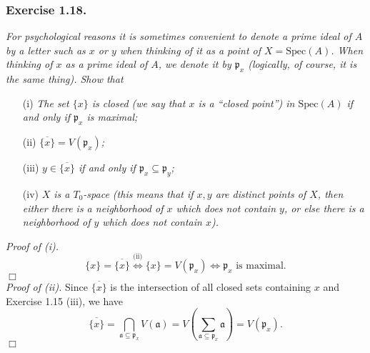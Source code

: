 \documentclass{article}
\begin{document}



\subsubsection*{Exercise 1.18.}
\emph{For psychological reasons it is sometimes convenient to denote a prime ideal of $A$ by
a letter such as $x$ or $y$ when thinking of it as a point of $X = \mathrm{Spec}(A)$.
When thinking of $x$ as a prime ideal of $A$, we denote it by $\mathfrak{p}_x$
(logically, of course, it is the same thing).
Show that}
\begin{enumerate}
\item[(i)]
  \emph{The set $\{x\}$ is closed
  (we say that $x$ is a ``closed point'') in $\mathrm{Spec}(A)$ if and only if $\mathfrak{p}_x$ is maximal;}

\item[(ii)]
  \emph{$\overline{\{x\}} = V(\mathfrak{p}_x)$;}

\item[(iii)]
  \emph{$y \in \overline{\{x\}}$ if and only if $\mathfrak{p}_x \subseteq \mathfrak{p}_y$;}

\item[(iv)]
  \emph{$X$ is a $T_0$-space
  (this means that if $x, y$ are distinct points of $X$,
  then either there is a neighborhood of $x$ which does not contain $y$,
  or else there is a neighborhood of $y$ which does not contain $x$).} \\
\end{enumerate}



\emph{Proof of (i).}
  \[
    \{x\} = \overline{\{x\}}
    \stackrel{\text{(ii)}}{\Longleftrightarrow}
    \{x\} = V(\mathfrak{p}_x)
    \Longleftrightarrow
    \text{$\mathfrak{p}_x$ is maximal}.
  \]
$\Box$ \\



\emph{Proof of (ii).}
  Since $\overline{\{x\}}$ is the intersection of all closed sets containing $x$ and Exercise 1.15 (iii),
  we have
  \[
    \overline{\{x\}}
    = \bigcap_{\mathfrak{a} \subseteq \mathfrak{p}_x} V(\mathfrak{a})
    = V\left( \sum_{\mathfrak{a} \subseteq \mathfrak{p}_x} \mathfrak{a} \right) 
    = V(\mathfrak{p}_x).
  \]
$\Box$ \\
\end{document}
